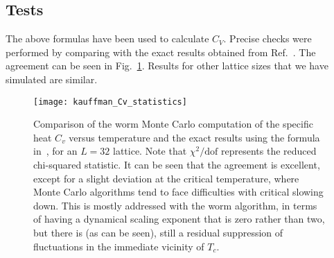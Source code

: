 \documentclass[../main.tex]{subfiles}
\begin{document}
\subsection{Tests}%
\label{ssec:tests}
The above formulas have been used to calculate $C_V$.
%
Precise checks were performed by comparing with the exact results obtained from
Ref.~\cite{bkaufman}.
%
The agreement  can be seen in Fig.~\ref{Kcompare}.
%
Results for other lattice sizes that we have simulated are similar.
%
\begin{figure}[htpb]
 \centering
 \texttt{[image: kauffman\_Cv\_statistics]}
 \caption{Comparison of the worm Monte Carlo computation of the specific heat
		$C_v$ versus temperature and the exact results using the formula
		in~\cite{bkaufman}, for an $L=32$ lattice. Note that $\chi^2 / \text{dof}$
		represents the reduced chi-squared statistic. It can be seen that the
		agreement is excellent, except for a slight deviation at the critical
		temperature, where Monte Carlo algorithms tend to face difficulties with
		critical slowing down.  This is mostly addressed with the worm algorithm,
		in terms of having a dynamical scaling exponent that is zero rather than
		two, but there is (as can be seen), still a residual suppression of
		fluctuations in the immediate vicinity of $T_c$.}%
	 \label{Kcompare}
\end{figure}
%
\end{document}
